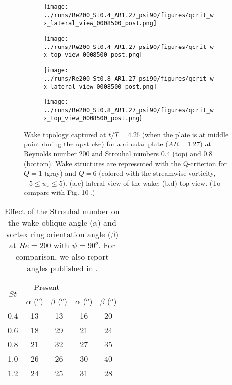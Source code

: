 \begin{figure}
  \centering
  \begin{subfigure}[]{0.45\textwidth}
    \centering
    \texttt{[image: ../runs/Re200\_St0.4\_AR1.27\_psi90/figures/qcrit\_wx\_lateral\_view\_0008500\_post.png]}
    \caption{}
  \end{subfigure}
  \hfill
  \begin{subfigure}[]{0.45\textwidth}
    \centering
    \texttt{[image: ../runs/Re200\_St0.4\_AR1.27\_psi90/figures/qcrit\_wx\_top\_view\_0008500\_post.png]}
    \caption{}
  \end{subfigure}
  \vspace{1cm}
  \begin{subfigure}[]{0.45\textwidth}
    \centering
    \texttt{[image: ../runs/Re200\_St0.8\_AR1.27\_psi90/figures/qcrit\_wx\_lateral\_view\_0008500\_post.png]}
    \caption{}
  \end{subfigure}
  \hfill
  \begin{subfigure}[]{0.45\textwidth}
    \centering
    \texttt{[image: ../runs/Re200\_St0.8\_AR1.27\_psi90/figures/qcrit\_wx\_top\_view\_0008500\_post.png]}
    \caption{}
  \end{subfigure}
  \caption{Wake topology captured at $t / T = 4.25$ (when the plate is at middle point during the upstroke) for a circular plate ($AR = 1.27$) at Reynolds number $200$ and Strouhal numbers $0.4$ (top) and $0.8$ (bottom). Wake structures are represented with the Q-criterion for $Q = 1$ (gray) and $Q = 6$ (colored with the streamwise vorticity, $-5 \leq w_x \leq 5$). (a,c) lateral view of the wake; (b,d) top view. (To compare with Fig. 10 \citet{li_dong_2016}.)}
  \label{fig:strouhal_wake_topology}
\end{figure}

\begin{table}
  \centering
  \begin{tabular}{ccccc}
    \hline\hline
    \multirow{2}{*}{$St$} &
      \multicolumn{2}{c}{Present} &
      \multicolumn{2}{c}{\citet{li_dong_2016}} \\
    & $\alpha$ ($^o$) & $\beta$ ($^o$) & $\alpha$ ($^o$) & $\beta$ ($^o$) \\
    \hline
    0.4 & 13 & 13 & 16 & 20 \\
    0.6 & 18 & 29 & 21 & 24 \\
    0.8 & 21 & 32 & 27 & 35 \\
    1.0 & 26 & 26 & 30 & 40 \\
    1.2 & 24 & 25 & 31 & 28 \\
    \hline\hline
  \end{tabular}
  \caption{Effect of the Strouhal number on the wake oblique angle ($\alpha$) and vortex ring orientation angle ($\beta$) at $Re = 200$ with $\psi = 90^o$. For comparison, we also report angles published in \citet{li_dong_2016}.}
  \label{tab:strouhal_angles}
\end{table}

